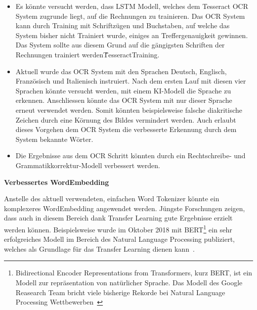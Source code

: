 \begin{itemize}
    \item Es könnte versucht werden, dass LSTM Modell, welches dem Tesseract OCR System zugrunde liegt, auf die Rechnungen zu trainieren. Das OCR System kann durch Training mit Schriftzügen und Buchstaben, auf welche das System bisher nicht Trainiert wurde, einiges an Treffergenauigkeit gewinnen. Das System sollte aus diesem Grund auf die gängigsten Schriften der Rechnungen trainiert werden\~{TesseractTraining}.
    \item Aktuell wurde das OCR System mit den Sprachen Deutsch, Englisch, Französisch und Italienisch instruiert. Nach dem ersten Lauf mit diesen vier Sprachen könnte versucht werden, mit einem KI-Modell die Sprache zu erkennen. Anschliessen könnte das OCR System mit nur dieser Sprache erneut verwendet werden. Somit könnten beispielsweise falsche diakritische Zeichen durch eine Körnung des Bildes vermindert werden. Auch erlaubt dieses Vorgehen dem OCR System die verbesserte Erkennung durch dem System bekannte Wörter.
    \item Die Ergebnisse aus dem OCR Schritt könnten durch ein Rechtschreibe- und Grammatikkorrektur-Modell verbessert werden. 
\end{itemize}

\textbf{Verbessertes WordEmbedding}

Anstelle des aktuell verwendeten, einfachen Word Tokenizer könnte ein komplexeres WordEmbedding angewendet werden. Jüngste Forschungen zeigen, dass auch in diesem Bereich dank Transfer Learning gute Ergebnisse erzielt werden können. Beispielsweise wurde im Oktober 2018 mit BERT\footnote{Bidirectional Encoder Representations from Transformers, kurz BERT, ist ein Modell zur repräsentation von natürlicher Sprache. Das Modell des Google Reasearch Team bricht viele bisherige Rekorde bei Natural Language Processing Wettbewerben~\autocite{Devlin2018}} ein sehr erfolgreiches Modell im Bereich des Natural Language Processing publiziert, welches als Grundlage für das Transfer Learning dienen kann~\autocite{Devlin2018}.


